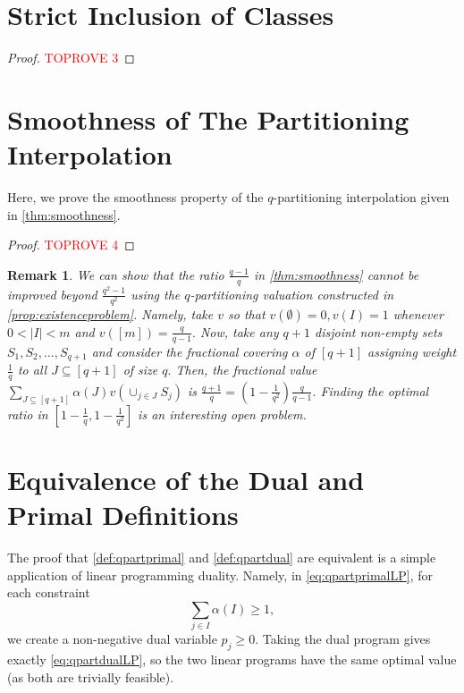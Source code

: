\documentclass[11pt]{article}\usepackage{amsfonts}
\newtheorem{remark}[theorem]{Remark}
\numberwithin{theorem}{subsection}
\begin{document}
\printbibliography
\appendix

\section{Strict Inclusion of Classes}
\label{appendix:existenceproblem}
\begin{proof}\textcolor{red}{TOPROVE 3}\end{proof}


\section{Smoothness of The Partitioning Interpolation}
\label{section:properties}
Here, we prove the smoothness property of the $q$-partitioning interpolation given in \cref{thm:smoothness}. 

\begin{proof}\textcolor{red}{TOPROVE 4}\end{proof}

\begin{remark}
\label{remark:closenessgap}
\normalfont
We can show that the ratio $\frac{q-1}{q}$ in \cref{thm:smoothness} cannot be improved beyond $ \frac{q^2 - 1}{q^2}$ using
the $q$-partitioning valuation constructed in \cref{prop:existenceproblem}. Namely, take $v$ so that $v(\emptyset) =0,
v(I) = 1$ whenever $0 <|I|<m$ and $v([m]) =\frac{q}{q-1}.$ Now, take any $q+1$ disjoint non-empty sets $S_1, S_2, \ldots, S_{q+1}$ and consider the fractional covering $\alpha$ of $[q+1]$
assigning weight $\frac{1}{q}$ to all $J\subseteq [q+1]$ of  size $q.$ Then, the fractional value 
$\displaystyle \sum_{J \subseteq [q+1]}\alpha(J)v(\cup_{j \in J}S_j)$
is $\frac{q+1}{q} = (1 - \frac{1}{q^2})\frac{q}{q-1}.$ Finding the optimal ratio in $[1 - \frac{1}{q}, 1 - \frac{1}{q^2}]$ is an interesting open problem.
\end{remark}


\section{Equivalence of the Dual and Primal Definitions}
\label{section:definitionequivalence}
The proof that \cref{def:qpartprimal} and \cref{def:qpartdual} are equivalent is a simple application of 
linear programming duality. Namely, in \cref{eq:qpartprimalLP}, for each constraint 
$$
\sum_{j \in I}
\alpha(I)\ge 1, 
$$
we create a non-negative dual variable $p_j \ge 0.$ Taking the dual program gives exactly 
\cref{eq:qpartdualLP}, so the two linear programs have the same optimal value (as both are trivially feasible).
\end{document}

